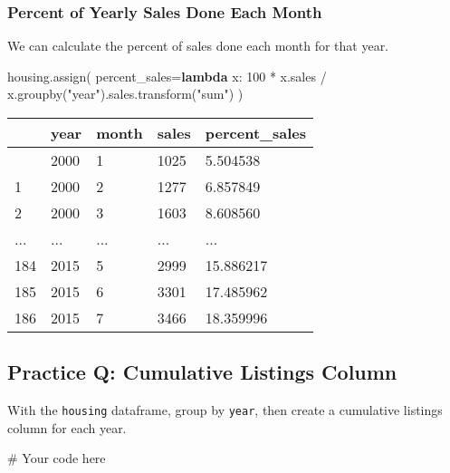 \documentclass[
  letterpaper,
  DIV=11,
  numbers=noendperiod]{scrreprt}
\newenvironment{Shaded}{\begin{snugshade}}{\end{snugshade}}
\newcommand{\CommentTok}[1]{\textcolor[rgb]{0.37,0.37,0.37}{#1}}
\newcommand{\DecValTok}[1]{\textcolor[rgb]{0.68,0.00,0.00}{#1}}
\newcommand{\KeywordTok}[1]{\textcolor[rgb]{0.00,0.23,0.31}{\textbf{#1}}}
\newcommand{\NormalTok}[1]{\textcolor[rgb]{0.00,0.23,0.31}{#1}}
\newcommand{\OperatorTok}[1]{\textcolor[rgb]{0.37,0.37,0.37}{#1}}
\newcommand{\StringTok}[1]{\textcolor[rgb]{0.13,0.47,0.30}{#1}}
\begin{document}
\subsubsection{Percent of Yearly Sales Done Each
Month}\label{percent-of-yearly-sales-done-each-month}

We can calculate the percent of sales done each month for that year.

\begin{Shaded}
\begin{Highlighting}[]
\NormalTok{housing.assign(}
\NormalTok{    percent\_sales}\OperatorTok{=}\KeywordTok{lambda}\NormalTok{ x: }\DecValTok{100} \OperatorTok{*}\NormalTok{ x.sales }\OperatorTok{/}\NormalTok{ x.groupby(}\StringTok{"year"}\NormalTok{).sales.transform(}\StringTok{"sum"}\NormalTok{)}
\NormalTok{)}
\end{Highlighting}
\end{Shaded}

\begin{longtable}[]{@{}lllll@{}}
\toprule\noalign{}
& year & month & sales & percent\_sales \\
\midrule\noalign{}
\endhead
\bottomrule\noalign{}
\endlastfoot
0 & 2000 & 1 & 1025 & 5.504538 \\
1 & 2000 & 2 & 1277 & 6.857849 \\
2 & 2000 & 3 & 1603 & 8.608560 \\
... & ... & ... & ... & ... \\
184 & 2015 & 5 & 2999 & 15.886217 \\
185 & 2015 & 6 & 3301 & 17.485962 \\
186 & 2015 & 7 & 3466 & 18.359996 \\
\end{longtable}

\begin{tcolorbox}[enhanced jigsaw, colframe=quarto-callout-tip-color-frame, opacityback=0, titlerule=0mm, bottomrule=.15mm, breakable, leftrule=.75mm, colbacktitle=quarto-callout-tip-color!10!white, title=\textcolor{quarto-callout-tip-color}{\faLightbulb}\hspace{0.5em}{Practice}, rightrule=.15mm, coltitle=black, opacitybacktitle=0.6, colback=white, left=2mm, arc=.35mm, toptitle=1mm, bottomtitle=1mm, toprule=.15mm]

\subsection{Practice Q: Cumulative Listings
Column}\label{practice-q-cumulative-listings-column}

With the \texttt{housing} dataframe, group by \texttt{year}, then create
a cumulative listings column for each year.

\begin{Shaded}
\begin{Highlighting}[]
\CommentTok{\# Your code here}
\end{Highlighting}
\end{Shaded}

\end{tcolorbox}
\end{document}
